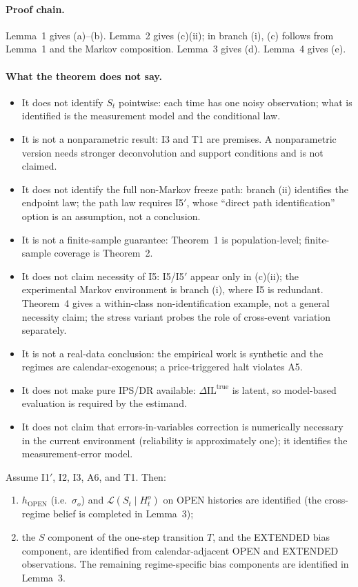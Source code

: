 \paragraph{Proof chain.}
Lemma~1 gives (a)--(b).  Lemma~2 gives (c)(ii); in branch (i), (c) follows from
Lemma~1 and the Markov composition.  Lemma~3 gives (d).  Lemma~4 gives (e).

\paragraph{What the theorem does not say.}
\begin{itemize}
\item It does not identify $S_t$ pointwise: each time has one noisy observation;
what is identified is the measurement model and the conditional law.
\item It is not a nonparametric result: I3 and T1 are premises.  A nonparametric
version needs stronger deconvolution and support conditions and is not claimed.
\item It does not identify the full non-Markov freeze path: branch (ii)
identifies the endpoint law; the path law requires I5$'$, whose ``direct path
identification'' option is an assumption, not a conclusion.
\item It is not a finite-sample guarantee: Theorem~1 is population-level;
finite-sample coverage is Theorem~2.
\item It does not claim necessity of I5: I5/I5$'$ appear only in (c)(ii); the
experimental Markov environment is branch (i), where I5 is redundant.
Theorem~4 gives a within-class non-identification example, not a general
necessity claim; the stress variant probes the role of cross-event variation
separately.
\item It is not a real-data conclusion: the empirical work is synthetic and the
regimes are calendar-exogenous; a price-triggered halt violates A5.
\item It does not make pure IPS/DR available: $\Delta\mathrm{IL}^{\mathrm{true}}$
is latent, so model-based evaluation is required by the estimand.
\item It does not claim that errors-in-variables correction is numerically
necessary in the current environment (reliability is approximately one); it
identifies the measurement-error model.
\end{itemize}

\begin{aIlemA}
Assume I1$'$, I2, I3, A6, and T1.  Then:
\begin{enumerate}
\item[(i)] $h_{\mathrm{OPEN}}$ (i.e.\ $\sigma_o$) and
$\mathcal L(S_t\mid H_t^o)$ on OPEN histories are identified (the
cross-regime belief is completed in Lemma~3);
\item[(ii)] the $S$ component of the one-step transition $T$, and the EXTENDED
bias component, are identified from calendar-adjacent OPEN and EXTENDED
observations.  The remaining regime-specific bias components are identified in
Lemma~3.
\end{enumerate}
\end{aIlemA}

